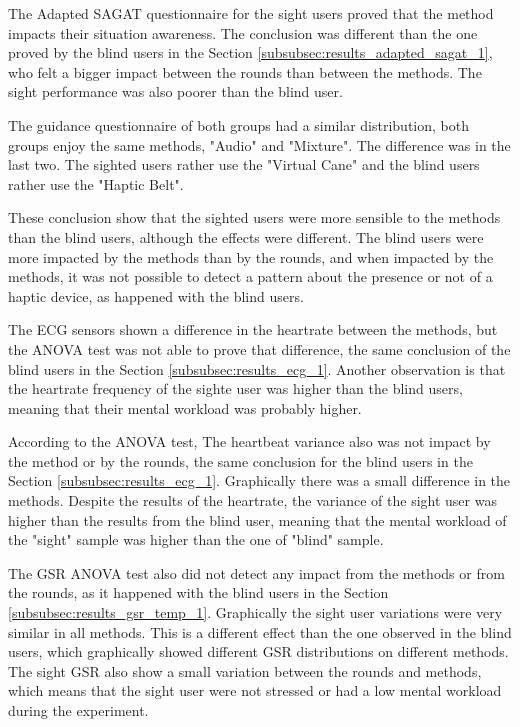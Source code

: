 The Adapted SAGAT questionnaire for the sight users proved that the method impacts their situation awareness. The conclusion was different than the one proved by the blind users in the Section \ref{subsubsec:results_adapted_sagat_1}, who felt a bigger impact between the rounds than between the methods. The sight performance was also poorer than the blind user.

The guidance questionnaire of both groups had a similar distribution, both groups enjoy the same methods, "Audio" and "Mixture". The difference was in the last two. The sighted users rather use the "Virtual Cane" and the blind users rather use the "Haptic Belt".

These conclusion show that the sighted users were more sensible to the methods than the blind users, although the effects were different. The blind users were more impacted by the methods than by the rounds, and when impacted by the methods, it was not possible to detect a pattern about the presence or not of a haptic device, as happened with the blind users.

The ECG sensors shown a difference in the heartrate between the methods, but the ANOVA test was not able to prove that difference, the same conclusion of the blind users in the Section \ref{subsubsec:results_ecg_1}. Another observation is that the heartrate frequency of the sighte user was higher than the blind users, meaning that their mental workload was probably higher.

According to the ANOVA test, The heartbeat variance also was not impact by the method or by the rounds, the same conclusion for the blind users in the Section \ref{subsubsec:results_ecg_1}. Graphically there was a small difference in the methods. Despite the results of the heartrate, the variance of the sight user was higher than the results from the blind user, meaning that the mental workload of the "sight" sample was higher than the one of "blind" sample.

The GSR ANOVA test also did not detect any impact from the methods or from the rounds, as it happened with the blind users in the Section \ref{subsubsec:results_gsr_temp_1}. Graphically the sight user variations were very similar in all methods. This is a different effect than the one observed in the blind users, which graphically showed different GSR distributions on different methods. The sight GSR also show a small variation between the rounds and methods, which means that the sight user were not stressed or had a low mental workload during the experiment.

